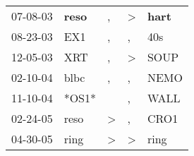 \begin{supertabular}{p{0.07\textwidth}p{0.06\textwidth}p{0.02\textwidth}p{0.02\textwidth}p{0.06\textwidth}}
 07-08-03\textsuperscript{} &  \textbf{reso\textsuperscript{}} &             , &  \textgreater &  \textbf{hart\textsuperscript{}} \\
 08-23-03\textsuperscript{} &            EX1\textsuperscript{} &             , &             , &            40s\textsuperscript{} \\
 12-05-03\textsuperscript{} &            XRT\textsuperscript{} &             , &  \textgreater &           SOUP\textsuperscript{} \\
 02-10-04\textsuperscript{} &           blbc\textsuperscript{} &             , &             , &           NEMO\textsuperscript{} \\
 11-10-04\textsuperscript{} &                            *OS1* &               &             , &           WALL\textsuperscript{} \\
 02-24-05\textsuperscript{} &           reso\textsuperscript{} &  \textgreater &             , &           CRO1\textsuperscript{} \\
 04-30-05\textsuperscript{} &           ring\textsuperscript{} &  \textgreater &  \textgreater &           ring\textsuperscript{} \\
\end{supertabular}

